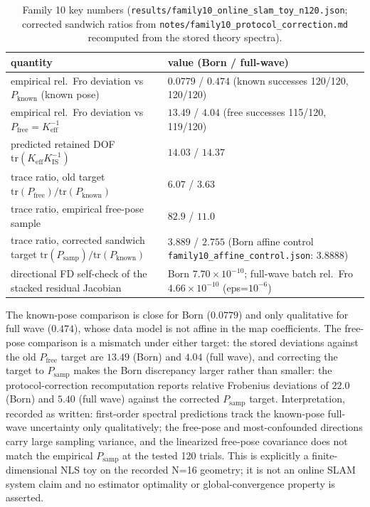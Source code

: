 \documentclass[12pt]{article}
\begin{document}
\begin{table}[htbp]
\centering
\small
\caption{Family 10 key numbers
(\texttt{results/family10\_online\_slam\_toy\_n120.json};
corrected sandwich ratios from \texttt{notes/family10\_protocol\_correction.md}
recomputed from the stored theory spectra).}
\label{tab:f10}
\begin{tabular}{p{} p{}}
\toprule
quantity & value (Born / full-wave) \\
\midrule
empirical rel.\ Fro deviation vs $P_{\mathrm{known}}$ (known pose) &
$0.0779$ / $0.474$ (known successes 120/120, 120/120) \\
empirical rel.\ Fro deviation vs $P_{\mathrm{free}}=K_{\mathrm{eff}}^{-1}$ &
$13.49$ / $4.04$ (free successes 115/120, 119/120) \\
predicted retained DOF $\mathrm{tr}(K_{\mathrm{eff}}K_{\mathrm{IS}}^{-1})$ &
$14.03$ / $14.37$ \\
trace ratio, old target $\mathrm{tr}(P_{\mathrm{free}})/\mathrm{tr}(P_{\mathrm{known}})$ &
$6.07$ / $3.63$ \\
trace ratio, empirical free-pose sample &
$82.9$ / $11.0$ \\
trace ratio, corrected sandwich target
$\mathrm{tr}(P_{\mathrm{samp}})/\mathrm{tr}(P_{\mathrm{known}})$ &
$3.889$ / $2.755$ (Born affine control
\texttt{family10\_affine\_control.json}: $3.8888$) \\
directional FD self-check of the stacked residual Jacobian &
Born $7.70\times10^{-10}$; full-wave batch rel.\ Fro
$4.66\times10^{-10}$ (eps=$10^{-6}$) \\
\bottomrule
\end{tabular}
\end{table}

The known-pose comparison is close for Born ($0.0779$) and only qualitative
for full wave ($0.474$), whose data model is not affine in the map
coefficients. The free-pose comparison is a mismatch under either target: the
stored deviations against the old $P_{\mathrm{free}}$ target are $13.49$
(Born) and $4.04$ (full wave), and correcting the target to $P_{\mathrm{samp}}$
makes the Born discrepancy larger rather than smaller: the protocol-correction
recomputation reports relative Frobenius deviations of $22.0$ (Born) and $5.40$
(full wave) against the corrected $P_{\mathrm{samp}}$ target.
Interpretation, recorded as written: first-order spectral predictions track
the known-pose full-wave uncertainty only qualitatively; the free-pose and
most-confounded directions carry large sampling variance, and the linearized
free-pose covariance does not match the empirical $P_{\mathrm{samp}}$ at the
tested 120 trials. This is explicitly a finite-dimensional NLS toy on the
recorded N=16 geometry; it is not an online SLAM system claim and no
estimator optimality or global-convergence property is asserted.
\end{document}
